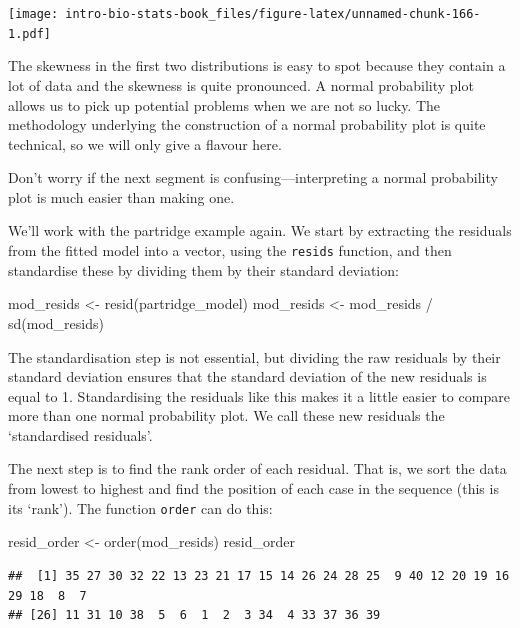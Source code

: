 \documentclass[
]{book}
\newenvironment{Shaded}{\begin{snugshade}}{\end{snugshade}}
\newcommand{\FunctionTok}[1]{\textcolor[rgb]{0.00,0.00,0.00}{#1}}
\newcommand{\NormalTok}[1]{#1}
\newcommand{\OtherTok}[1]{\textcolor[rgb]{0.56,0.35,0.01}{#1}}
\newcommand{\SpecialCharTok}[1]{\textcolor[rgb]{0.00,0.00,0.00}{#1}}
\begin{document}
\texttt{[image: intro-bio-stats-book\_files/figure-latex/unnamed-chunk-166-1.pdf]}

The skewness in the first two distributions is easy to spot because they contain a lot of data and the skewness is quite pronounced. A normal probability plot allows us to pick up potential problems when we are not so lucky. The methodology underlying the construction of a normal probability plot is quite technical, so we will only give a flavour here.

Don't worry if the next segment is confusing---interpreting a normal probability plot is much easier than making one.

We'll work with the partridge example again. We start by extracting the residuals from the fitted model into a vector, using the \texttt{resids} function, and then standardise these by dividing them by their standard deviation:

\begin{Shaded}
\begin{Highlighting}[]
\NormalTok{mod\_resids }\OtherTok{\textless{}{-}} \FunctionTok{resid}\NormalTok{(partridge\_model)}
\NormalTok{mod\_resids }\OtherTok{\textless{}{-}}\NormalTok{ mod\_resids }\SpecialCharTok{/} \FunctionTok{sd}\NormalTok{(mod\_resids)}
\end{Highlighting}
\end{Shaded}

The standardisation step is not essential, but dividing the raw residuals by their standard deviation ensures that the standard deviation of the new residuals is equal to 1. Standardising the residuals like this makes it a little easier to compare more than one normal probability plot. We call these new residuals the `standardised residuals'.

The next step is to find the rank order of each residual. That is, we sort the data from lowest to highest and find the position of each case in the sequence (this is its `rank'). The function \texttt{order} can do this:

\begin{Shaded}
\begin{Highlighting}[]
\NormalTok{resid\_order }\OtherTok{\textless{}{-}} \FunctionTok{order}\NormalTok{(mod\_resids)}
\NormalTok{resid\_order}
\end{Highlighting}
\end{Shaded}

\begin{verbatim}
##  [1] 35 27 30 32 22 13 23 21 17 15 14 26 24 28 25  9 40 12 20 19 16 29 18  8  7
## [26] 11 31 10 38  5  6  1  2  3 34  4 33 37 36 39
\end{verbatim}
\end{document}
